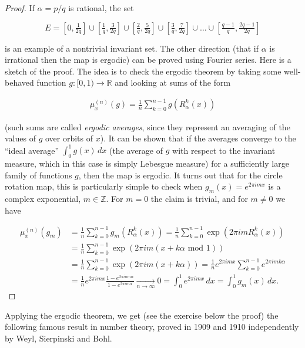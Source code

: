 \documentclass[11pt]{report}
\theoremstyle{plain}
\theoremstyle{definition}
\begin{document}
\begin{proof}
If $\alpha=p/q$ is rational, the set

\[
E = \left[0, \tfrac{1}{2q}\right]
\cup \left[\tfrac{1}{q}, \tfrac{3}{2q}\right]
\cup \left[\tfrac{2}{q}, \tfrac{5}{2q}\right]
\cup \left[\tfrac{3}{q}, \tfrac{7}{2q}\right]
\cup \ldots
\cup \left[\tfrac{q-1}{q}, \tfrac{2q-1}{2q}\right]
\]

\noindent is an example of a nontrivial invariant set. The other
direction (that if $\alpha$ is irrational then the map
is ergodic) can be proved using Fourier series. Here
is a sketch of the proof. The idea is to check the
ergodic theorem by taking some well-behaved function
$g:[0,1)\to\mathbb{R}$ and looking at sums of the form

\begin{align*}
\mu_x^{(n)}(g) = \frac{1}{n} \sum_{k=0}^{n-1} g(R_\alpha^k(x))
\end{align*}

\noindent (such sums are called \emph{ergodic averages}, since they
represent an averaging of the values of $g$ over
orbits of $x$). It can be shown that if the averages
converge to the ``ideal average'' $\int_0^1 g(x)\,dx$
(the average of $g$ with respect to the invariant
measure, which in this case is simply Lebesgue
measure) for a sufficiently large family of functions
$g$, then the map is ergodic. It turns out that for
the circle rotation map, this is particularly simple
to check when $g_m(x)=e^{2\pi i m x}$ is a complex
exponential, $m\in\mathbb{Z}$. For $m=0$ the claim is
trivial, and for $m\neq 0$ we have

\begin{align*}
\mu_x^{(n)}(g_m) &=
\frac{1}{n} \sum_{k=0}^{n-1} g_m(R_\alpha^k(x)) =
\frac{1}{n} \sum_{k=0}^{n-1} \exp(2\pi i m R_\alpha^k(x)) \\ &=
\frac{1}{n} \sum_{k=0}^{n-1} \exp(2\pi i m (x+k\alpha \textrm{ mod }1)) \\
&=
\frac{1}{n} \sum_{k=0}^{n-1} \exp(2\pi i m (x+k\alpha))
=
\frac{1}{n} e^{2\pi i m x} \sum_{k=0}^{n-1} e^{2\pi i m k \alpha} \\
&=
\frac{1}{n} e^{2\pi i m x} \frac{1-e^{2\pi i n m \alpha}}{1-e^{2\pi i m \alpha}} \xrightarrow[n\to\infty]{}0=\int_0^1 e^{2\pi i m x}\,dx = \int_0^1 g_m(x)\,dx.
\end{align*}

\end{proof}

\noindent Applying the ergodic theorem, we get (see the exercise
below the proof) the following famous result in number
theory, proved in 1909 and 1910 independently by Weyl,
Sierpinski and Bohl.
\end{document}
